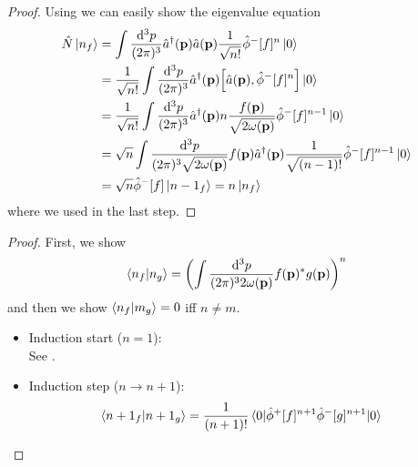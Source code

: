 \begin{proof}
	Using  we can easily show the eigenvalue equation
	\begin{equation*}
		\begin{split}
			\hat{N}
			\ket{n_f}
			&=
			\int\frac{\dd[3]{p}}{(2\pi)^3}
			\hat{a}^\dagger(\vb{p})
			\hat{a}(\vb{p})
			\frac{1}{\sqrt{n!}}
			\hat\phi^-[f]^n
			\ket{0}
			\\
			&=
			\frac{1}{\sqrt{n!}}
			\int\frac{\dd[3]{p}}{(2\pi)^3}
			\hat{a}^\dagger(\vb{p})
			\comm{\hat{a}(\vb{p})}{\hat\phi^-[f]^n}
			\ket{0}
			\\
			&=
			\frac{1}{\sqrt{n!}}
			\int\frac{\dd[3]{p}}{(2\pi)^3}
			\hat{a}^\dagger(\vb{p})
			n
			\frac{f(\vb{p})}{\sqrt{2\omega(\vb{p})}}
			\hat\phi^-[f]^{n-1}
			\ket{0}
			\\
			&=
			\sqrt{n}
			\int\frac{\dd[3]{p}}{(2\pi)^3\sqrt{2\omega(\vb{p})}}
				f(\vb{p})
			\hat{a}^\dagger(\vb{p})
			\frac{1}{\sqrt{(n-1)!}}
			\hat\phi^-[f]^{n-1}
			\ket{0}
			\\
			&=
			\sqrt{n}
			\hat\phi^-[f]
			\ket{n-1_f}
			=
			n
			\ket{n_f}
		\end{split}
	\end{equation*}
	where we used  in the last step.
\end{proof}

\qkgnumberinnerproduct
\begin{proof}
	First, we show
	\begin{equation*}
		\braket{n_f}{n_g}
		=
		\left(
			\int\frac{\dd[3]{p}}{(2\pi)^32\omega(\vb{p})}
			f(\vb{p})^*
			g(\vb{p})
		\right)^n
	\end{equation*}
	and then we show $\braket{n_f}{m_g}=0$ iff $n\neq m$.
	\begin{itemize}
		\item Induction start ($n=1$):
		\\
		See .
		\item Induction step ($n\to n+1$):
		\\
		\begin{equation*}
			\begin{split}
				\braket{n+1_f}{n+1_g}
				&=
				\frac{1}{(n+1)!}
				\expval{\hat\phi^+[f]^{n+1}\hat\phi^-[g]^{n+1}}{0}
			\end{split}
		\end{equation*}
	\end{itemize}
\end{proof}

